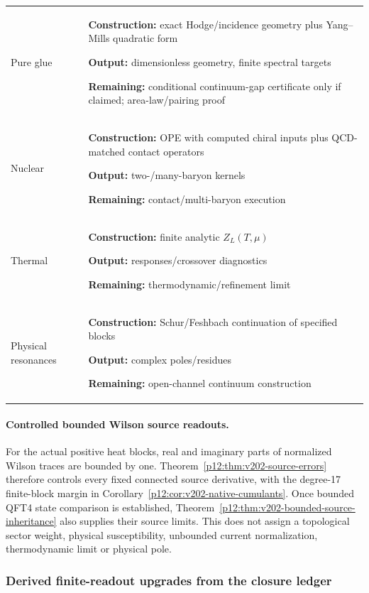 \documentclass[12pt,a4paper]{article}
\begin{document}
\begin{longtable}{@{}>{\raggedright\arraybackslash}p{} >{\raggedright\arraybackslash}p{}@{}}
Pure glue & \textbf{Construction:} exact Hodge/incidence geometry plus Yang--Mills quadratic form\par\textbf{Output:} dimensionless geometry, finite spectral targets\par\textbf{Remaining:} conditional continuum-gap certificate only if claimed; area-law/pairing proof  \\
Nuclear & \textbf{Construction:} OPE with computed chiral inputs plus QCD-matched contact operators\par\textbf{Output:} two-/many-baryon kernels\par\textbf{Remaining:} contact/multi-baryon execution  \\
Thermal & \textbf{Construction:} finite analytic \(Z_L(T,\mu)\)\par\textbf{Output:} responses/crossover diagnostics\par\textbf{Remaining:} thermodynamic/refinement limit  \\
Physical resonances & \textbf{Construction:} Schur/Feshbach continuation of specified blocks\par\textbf{Output:} complex poles/residues\par\textbf{Remaining:} open-channel continuum construction  \\
\bottomrule
\end{longtable}

\paragraph{Controlled bounded Wilson source readouts.}
\label{p11:par:v202-bounded-source-handoff}
For the actual positive heat blocks, real and imaginary parts of normalized
Wilson traces are bounded by one. Theorem~\ref{p12:thm:v202-source-errors}
therefore controls every fixed connected source derivative, with the
degree-17 finite-block margin in
Corollary~\ref{p12:cor:v202-native-cumulants}. Once bounded QFT4 state
comparison is established, Theorem~\ref{p12:thm:v202-bounded-source-inheritance}
also supplies their source limits. This does not assign a topological
sector weight, physical susceptibility, unbounded current normalization,
thermodynamic limit or physical pole.


\subsubsection{Derived finite-readout upgrades from the closure ledger}
\label{p11:subsec:derived-finite-readout-upgrades}
\end{document}

